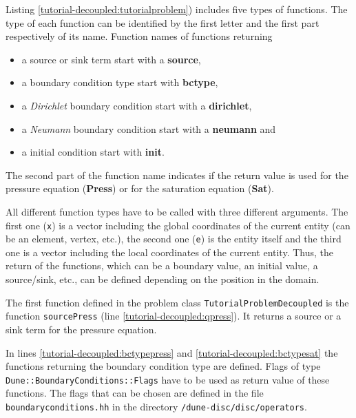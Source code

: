 \begin{lst}\label{tutorial-deoucpled:problemfile} \mbox{}

\end{lst}

Listing \ref{tutorial-decoupled:tutorialproblem}) includes five types of functions. The type of each function can be identified by the first letter and the first part respectively of its name. Function names of functions returning
\begin{itemize}
 \item a source or sink term start with a \textbf{source},
 \item a boundary condition type start with \textbf{bctype},
 \item a \textit{Dirichlet} boundary condition start with a \textbf{dirichlet},
 \item a \textit{Neumann} boundary condition start with a \textbf{neumann} and
 \item a initial condition start with \textbf{init}. 
\end{itemize}
The second part of the function name indicates if the return value is used for the pressure equation (\textbf{Press}) or for the saturation equation (\textbf{Sat}).

All different function types have to be called with three different arguments. The first one (\texttt{x}) is a vector including the global coordinates of the current entity (can be an element, vertex, etc.), the second one (\texttt{e}) is the entity itself and the third one is a vector including the local coordinates of the current entity. Thus, the return of the functions, which can be a boundary value, an initial value, a source/sink, etc., can be defined depending on the position in the domain.

The first function defined in the problem class \texttt{TutorialProblemDecoupled} is the function \texttt{sourcePress} (line \ref{tutorial-decoupled:qpress}). It returns a source or a sink term for the pressure equation. 

In lines \ref{tutorial-decoupled:bctypepress} and \ref{tutorial-decoupled:bctypesat} the functions returning the boundary condition type are defined. Flags of type \texttt{Dune::BoundaryConditions::Flags} have to be used as return value of these functions. The flags that can be chosen are defined in the file \texttt{boundaryconditions.hh} in the directory \texttt{/dune-disc/disc/operators}.


